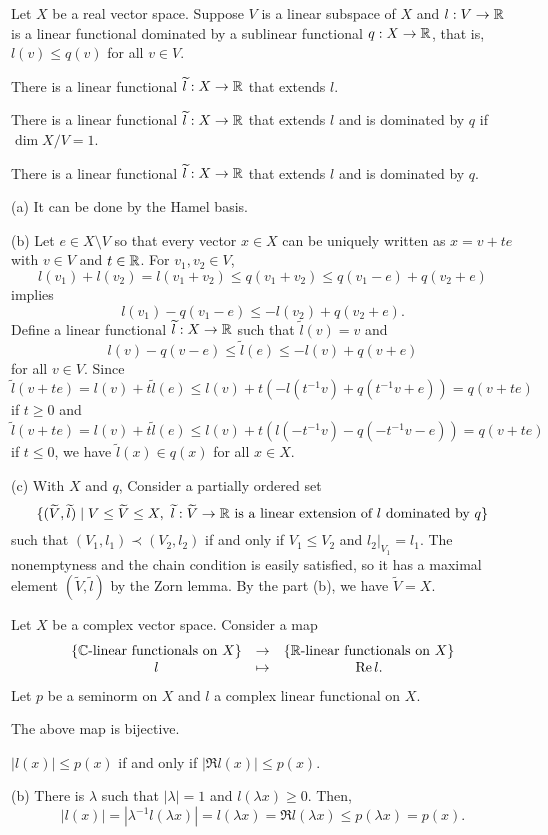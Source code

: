 \documentclass{../../large}
\begin{document}
\begin{prb}
Let $X$ be a real vector space.
Suppose $V$ is a linear subspace of $X$ and $l:V\to\mathbb{R}$ is a linear functional dominated by a sublinear functional $q:X\to\mathbb{R}$, that is, $l(v)\le q(v)$ for all $v\in V$.
\begin{parts}
\item There is a linear functional $\widetilde l:X\to\mathbb{R}$ that extends $l$.
\item There is a linear functional $\widetilde l:X\to\mathbb{R}$ that extends $l$ and is dominated by $q$ if $\dim X/V=1$.
\item There is a linear functional $\widetilde l:X\to\mathbb{R}$ that extends $l$ and is dominated by $q$.
\end{parts}
\end{prb}
\begin{pf}
(a)
It can be done by the Hamel basis.

(b)
Let $e\in X\setminus V$ so that every vector $x\in X$ can be uniquely written as $x=v+te$ with $v\in V$ and $t\in\mathbb{R}$.
For $v_1,v_2\in V$,
\[l(v_1)+l(v_2)=l(v_1+v_2)\le q(v_1+v_2)\le q(v_1-e)+q(v_2+e)\]
implies
\[l(v_1)-q(v_1-e)\le-l(v_2)+q(v_2+e).\]
Define a linear functional $\widetilde l:X\to\mathbb{R}$ such that $\tilde l(v)=v$ and
\[l(v)-q(v-e)\le\tilde l(e)\le-l(v)+q(v+e)\]
for all $v\in V$.
Since
\[\tilde l(v+te)=l(v)+t\tilde l(e)\le l(v)+t(-l(t^{-1}v)+q(t^{-1}v+e))=q(v+te)\]
if $t\ge0$ and
\[\tilde l(v+te)=l(v)+t\tilde l(e)\le l(v)+t(l(-t^{-1}v)-q(-t^{-1}v-e))=q(v+te)\]
if $t\le0$, we have $\tilde l(x)\in q(x)$ for all $x\in X$.

(c)
With $X$ and $q$, Consider a partially ordered set
\[\{(\widetilde V,\widetilde l)\mid
V\le\widetilde V\le X,\ \widetilde l:\widetilde V\to\mathbb{R}\text{ is a linear extension of $l$ dominated by $q$}\}\]
such that $(V_1,l_1)\prec(V_2,l_2)$ if and only if $V_1\le V_2$ and $l_2|_{V_1}=l_1$.
The nonemptyness and the chain condition is easily satisfied, so it has a maximal element $(\tilde V,\tilde l)$ by the Zorn lemma.
By the part (b), we have $\tilde V=X$.
\end{pf}

\begin{prb}
Let $X$ be a complex vector space.
Consider a map
\[\begin{array}{ccc}
\{\text{$\mathbb{C}$-linear functionals on $X$}\}
&\to&
\{\text{$\mathbb{R}$-linear functionals on $X$}\}\\
l&\mapsto&\operatorname{Re} l.
\end{array}\]
Let $p$ be a seminorm on $X$ and $l$ a complex linear functional on $X$.
\begin{parts}
\item The above map is bijective.
\item $|l(x)|\le p(x)$ if and only if $|\Re l(x)|\le p(x)$.
\end{parts}
\end{prb}
\begin{pf}
(b)
There is $\lambda$ such that $|\lambda|=1$ and $l(\lambda x)\ge0$.
Then,
\[|l(x)|=|\lambda^{-1}l(\lambda x)|=l(\lambda x)=\Re l(\lambda x)\le p(\lambda x)=p(x).\]
\end{pf}
\end{document}
